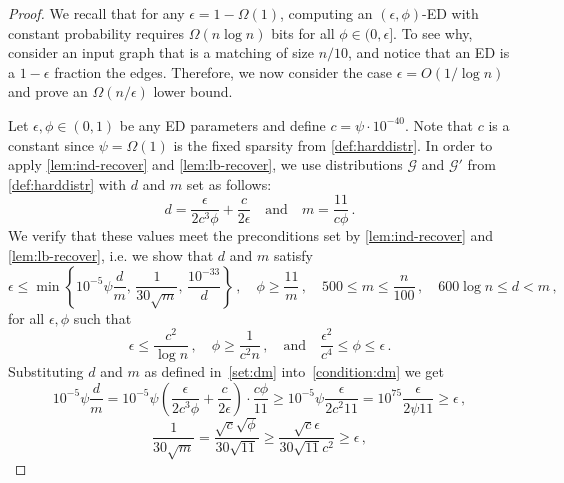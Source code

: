 \documentclass[epsfig,letter,11pt]{article}
\numberwithin{equation}{section}
\begin{document}
\begin{proof}
	We recall that for any $\epsilon = 1-\Omega(1)$, computing an $(\epsilon,\phi)$-ED with constant probability requires $\Omega(n \log n)$ bits for all $\phi \in (0,\epsilon]$. To see why, consider an input graph that is a matching of size $n/10$, and notice that an ED is a $1-\epsilon$ fraction the edges. Therefore, we now consider the case $\epsilon =  O(1/\log n)$ and prove an $\Omega(n/\epsilon)$ lower bound.
	
	Let $\epsilon,\phi \in (0,1)$ be any ED parameters and define $c = \psi \cdot 10^{-40}$. Note that $c$ is a constant since $\psi = \Omega(1)$ is the fixed sparsity from \cref{def:harddistr}. In order to apply  \cref{lem:ind-recover} and \cref{lem:lb-recover}, we use distributions  $\mathcal{G}$ and $\mathcal{G}'$ from \cref{def:harddistr} with $d$ and $m$ set as follows:
	\begin{equation}
		\label{set:dm}
		d = \frac{\epsilon}{2c^3 \phi } + \frac{c}{2 \epsilon} \quad \text{and} \quad m = \frac{11}{c \phi} \, .
	\end{equation}
	We verify that these values meet the preconditions set by \cref{lem:ind-recover} and \cref{lem:lb-recover}, i.e. we show that $d$ and $m$ satisfy
	\begin{equation}
		\label{condition:dm}
		\epsilon \le \min \left\{10^{-5} \psi \frac{d}{m} , \, \frac{1}{30\sqrt{m}}, \, \frac{10^{-33}}{d}\right\}\, , \quad \phi \ge \frac{11}{m}\, , \quad 500 \le m \le \frac{n}{100}\, , \quad 600\log n \le d < m \, ,
	\end{equation}
	for all $\epsilon,\phi$ such that
	\begin{equation}
		\label{setting:epsphi}
		\epsilon \le \frac{c^2}{\log n} \, , \quad \phi \ge \frac{1}{c^2n} \, , \quad \text{and} \quad \frac{\epsilon^2}{c^4} \le \phi \le \epsilon \, .
	\end{equation}
	Substituting $d$ and $m$ as defined in~\eqref{set:dm} into~\eqref{condition:dm} we get
	\begin{equation*}
		10^{-5} \psi \frac{d}{m} = 10^{-5} \psi \left(\frac{\epsilon}{2c^3 \phi } + \frac{c}{2 \epsilon} \right) \cdot \frac{c\phi}{11} \ge 10^{-5} \psi \frac{\epsilon}{2c^2 11 } = 10^{75} \frac{\epsilon}{2\psi 11 } \ge \epsilon \, ,
	\end{equation*}
\begin{equation*}
	\frac{1}{30\sqrt{m}} = \frac{\sqrt{c}\sqrt{\phi}}{30\sqrt{11}} \ge \frac{\sqrt{c}\epsilon}{30\sqrt{11}c^2} \ge \epsilon\, ,
\end{equation*}

\end{proof}
\end{document}
